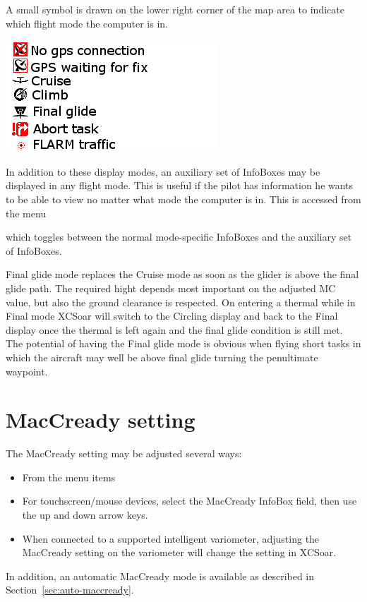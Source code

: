 \documentclass[a4paper,12pt]{refrep}
\begin{document}
A small symbol is drawn on the lower right corner of the map area to
indicate which flight mode the computer is in.

\includegraphics[angle=0,width=0.7\linewidth,keepaspectratio='true']{figures/symbology.png}

In addition to these display modes, an auxiliary set of InfoBoxes may
be displayed in any flight mode.  This is useful if the pilot has
information he wants to be able to view no matter what mode the
computer is in.  This is accessed from the menu
\begin{quote}
\blink{}\blink{}
\end{quote}

which toggles between the normal mode-specific InfoBoxes and
the auxiliary set of InfoBoxes.

Final glide mode replaces the Cruise mode as soon as the glider is above the
final glide path. The required hight depends most important on the adjusted MC
value, but also the ground clearance is respected. On entering a thermal while
in Final mode XCSoar will switch to the Circling display and back to the Final
display once the thermal is left again and the final glide condition is still
met. The potential of having the Final glide mode is obvious when
flying short tasks in which the aircraft may well be above final glide turning the penultimate
waypoint.

\section{MacCready setting}

The MacCready setting may be adjusted several ways:
\begin{itemize}
\item From the menu items
\begin{quote}
\blink{} 

\blink{}
\end{quote}
\item For touchscreen/mouse devices, select the MacCready InfoBox field, then
  use the up and down arrow keys.
\item When connected to a supported intelligent variometer, adjusting
  the MacCready setting on the variometer will change the setting
  in XCSoar.
\end{itemize}
In addition, an automatic MacCready mode is available as described in
Section~\ref{sec:auto-maccready}.
\end{document}
